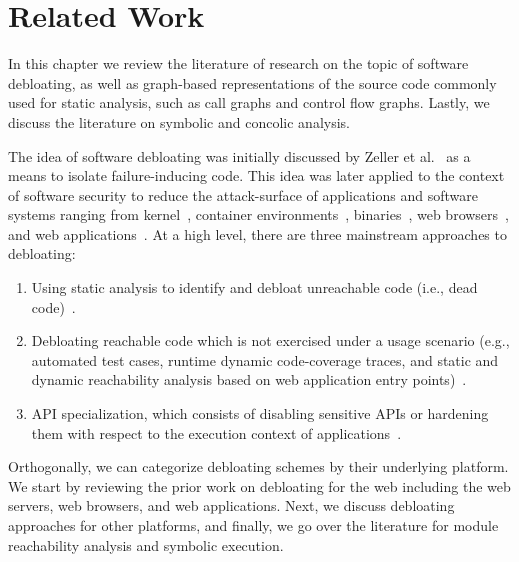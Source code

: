 \chapter{Related Work}
\label{chap:relatedwork}

In this chapter we review the literature of research on the topic of software debloating, as well as graph-based representations of the source code commonly used for static analysis, such as call graphs and control flow graphs. 
Lastly, we discuss the literature on symbolic and concolic analysis. 

The idea of software debloating was initially discussed by Zeller et al.~\cite{zeller2002simplifying} as a means to isolate failure-inducing code. 
This idea was later applied to the context of software security to reduce the attack-surface of applications and software systems ranging from kernel~\cite{abubakar2021shard}, container environments~\cite{rastogi2017Cimplifier,259711}, binaries~\cite{hasan2022decap, redini2019b, heo2018effective,ghavamnia2020temporal, mishra2020saffire, koo2019configuration, quach2018debloating}, web browsers~\cite{snyder2017most, qian2020slimium}, and web applications~\cite{azad2019less, bulekov2021saphire, mininode, jahanshahi2020you}. 
At a high level, there are three mainstream approaches to debloating: 

\begin{enumerate}
    \item Using static analysis to identify and debloat unreachable code (i.e., dead code)~\cite{redini2019b, snyder2017most, quach2018debloating, mininode, 255308}.
    \item Debloating reachable code which is not exercised under a usage scenario (e.g., automated test cases, runtime dynamic code-coverage traces, and static and dynamic reachability analysis based on web application entry points)~\cite{lessismore, heo2018effective,qian2020slimium, koo2019configuration}.
    \item API specialization, which consists of disabling sensitive APIs or hardening them with respect to the execution context of applications~\cite{mishra2020saffire, saphire, jahanshahi2020you, mishra2021sgxpecial}. 
\end{enumerate}

Orthogonally, we can categorize debloating schemes by their underlying platform. 
We start by reviewing the prior work on debloating for the web including the web servers, web browsers, and web applications. 
Next, we discuss debloating approaches for other platforms, and finally, we go over the literature for module reachability analysis and symbolic execution. 


